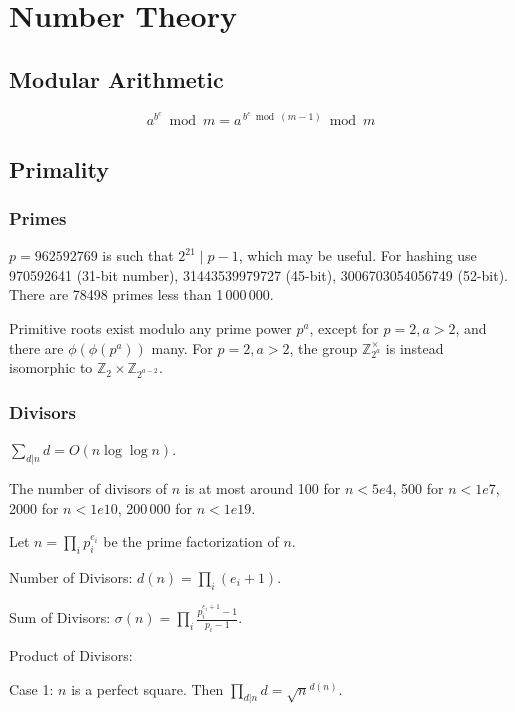 \chapter{Number Theory}

\section{Modular Arithmetic}
	\[a^{b^c} \bmod m = a^{\, b^c \bmod (m-1)} \bmod m\]

\section{Primality}
	\subsection{Primes}
	$p=962592769$ is such that $2^{21} \mid p-1$, which may be useful. For hashing
	use 970592641 (31-bit number), 31443539979727 (45-bit), 3006703054056749
	(52-bit). There are 78498 primes less than 1\,000\,000.

	Primitive roots exist modulo any prime power $p^a$, except for $p = 2, a > 2$, and there are $\phi(\phi(p^a))$ many.
	For $p = 2, a > 2$, the group $\mathbb Z_{2^a}^\times$ is instead isomorphic to $\mathbb Z_2 \times \mathbb Z_{2^{a-2}}$.

	\subsection{Divisors}
	$\sum_{d|n} d = O(n \log \log n)$.

	The number of divisors of $n$ is at most around 100 for $n < 5e4$, 500 for $n < 1e7$, 2000 for $n < 1e10$, 200\,000 for $n < 1e19$.

		Let $n = \prod_{i} p_i^{e_i}$ be the prime factorization of $n$.

	Number of Divisors: $d(n) = \prod_{i} (e_i + 1)$.

	Sum of Divisors: $\sigma(n) = \prod_{i} \frac{p_i^{e_i+1}-1}{p_i-1}$.	

	Product of Divisors: 

	Case 1: $n$ is a perfect square. Then $\prod_{d|n} d = \sqrt{n} ^ {d(n)}$.	

